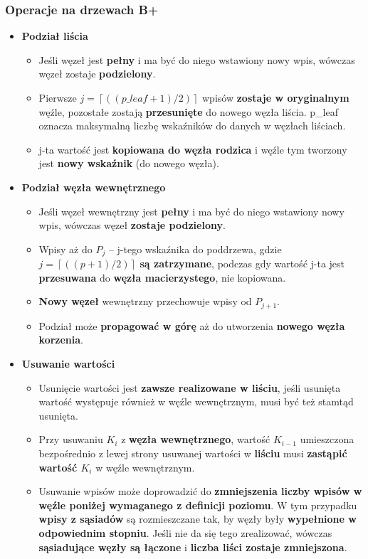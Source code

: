 \documentclass[a4paper]{article}
\begin{document}
\subsubsection{Operacje na drzewach B+}
\begin{itemize}
    \item \textbf{Podział liścia}
    \begin{itemize}
        \item Jeśli węzeł jest \textbf{pełny} i ma być do niego wstawiony nowy wpis, wówczas węzeł zostaje \textbf{podzielony}.
        \item Pierwsze $j = \left \lceil ((p\_leaf + 1)/2) \right \rceil$ wpisów \textbf{zostaje w oryginalnym} węźle, pozostałe zostają \textbf{przesunięte} do nowego węzła liścia. p\_leaf oznacza maksymalną liczbę wskaźników do danych w węzłach liściach.
        \item j-ta wartość jest \textbf{kopiowana do węzła rodzica} i węźle tym tworzony jest \textbf{nowy wskaźnik} (do nowego węzła).
    \end{itemize}
    \item \textbf{Podział węzła wewnętrznego}
    \begin{itemize}
        \item Jeśli węzeł wewnętrzny jest \textbf{pełny} i ma być do niego wstawiony nowy wpis, wówczas węzeł \textbf{zostaje podzielony}.
        \item Wpisy aż do $P_j$ – j-tego wskaźnika do poddrzewa, gdzie $j= \left \lceil ((p+1)/2) \right \rceil$ \textbf{są zatrzymane}, podczas gdy wartość j-ta jest \textbf{przesuwana} do \textbf{węzła macierzystego}, nie kopiowana.
        \item \textbf{Nowy węzeł} wewnętrzny przechowuje wpisy od $P_{j+1}$.
        \item Podział może \textbf{propagować w górę} aż do utworzenia \textbf{nowego węzła korzenia}.
    \end{itemize}
    \item \textbf{Usuwanie wartości}
    \begin{itemize}
        \item Usunięcie wartości jest \textbf{zawsze realizowane w liściu}, jeśli usunięta wartość występuje również w węźle wewnętrznym, musi być też stamtąd usunięta.
        \item Przy usuwaniu $K_i$ z \textbf{węzła wewnętrznego}, wartość $K_{i-1}$ umieszczona bezpośrednio z lewej strony usuwanej wartości w \textbf{liściu} musi \textbf{zastąpić wartość $K_i$} w węźle wewnętrznym.
        \item Usuwanie wpisów może doprowadzić do \textbf{zmniejszenia liczby wpisów w węźle poniżej wymaganego z definicji poziomu}. W tym przypadku \textbf{wpisy z sąsiadów} są rozmieszczane tak, by węzły były \textbf{wypełnione w odpowiednim stopniu}. Jeśli nie da się tego zrealizować, wówczas \textbf{sąsiadujące węzły są łączone} i \textbf{liczba liści zostaje zmniejszona}.
    \end{itemize}
\end{itemize}
\end{document}
